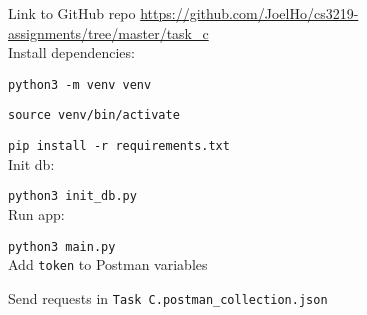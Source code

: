 \documentclass{article}
\begin{document}
    Link to GitHub repo \href{https://github.com/JoelHo/cs3219-assignments/tree/master/task_c}{https://github.com/JoelHo/cs3219-assignments/tree/master/task\_c}\\

    Install dependencies:

    \texttt{python3 -m venv venv}

    \texttt{source venv/bin/activate}

    \texttt{pip install -r requirements.txt}\\

    Init db:

    \texttt{python3 init\_db.py}\\

    Run app:

    \texttt{python3 main.py}\\

    Add \texttt{token} to Postman variables

    Send requests in \texttt{Task C.postman\_collection.json}
\end{document}
